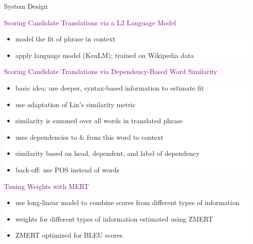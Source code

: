 \documentclass[final,t]{beamer}
\begin{document}
\begin{frame}{}
\begin{columns}[t]
\begin{column}{.55\linewidth}
\begin{block}{System Design}
\begin{center}
  \textcolor{purple}{Scoring Candidate Translations via a L2 Language Model}
 
  \colorbox{white}{
\begin{minipage}{.90\linewidth}
 \begin{itemize}
  \item model the fit of phrase in context
  \item apply language model (KenLM); trained on Wikipedia data
  \end{itemize}
\end{minipage}
}
\vspace{1cm}






  \textcolor{purple}{Scoring Candidate Translations via Dependency-Based Word Similarity}

  \colorbox{white}{
\begin{minipage}{.90\linewidth}
  \begin{itemize}
  \item basic idea: use deeper, syntax-based information to estimate fit
  \item use adaptation of Lin's similarity metric
  \item similarity is summed over all words in translated phrase
  \item uses dependencies to \& from this word to context
  \item similarity based on head, dependent, and label of dependency 
  \item back-off: use POS instead of words
  \end{itemize}
\end{minipage}
}
\vspace{1cm}

  \textcolor{purple}{Tuning Weights with MERT}

  \colorbox{white}{
\begin{minipage}{.90\linewidth}
  \begin{itemize}
  \item use long-linear model to combine scores from different types of information
  \item weights for different types of information estimated using ZMERT
  \item ZMERT optimized for BLEU scores
  \end{itemize}
\end{minipage}
}


\end{center}
\end{block}
\end{column}
\end{columns}
\end{frame}
\end{document}
